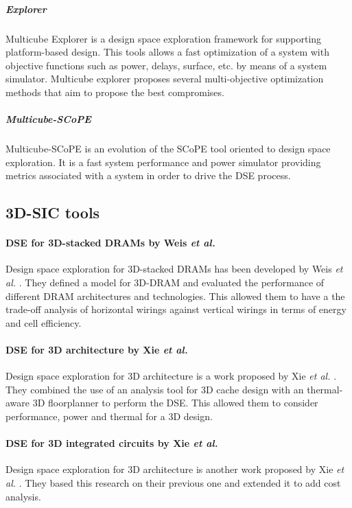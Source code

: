 \subparagraph{Explorer}

Multicube Explorer \cite{m3explorer09} is a design space exploration framework for supporting platform-based design. This tools allows a fast optimization of a system with objective functions such as power, delays, surface, etc. by means of a system simulator. Multicube explorer proposes several multi-objective optimization methods that aim to propose the best compromises.

\subparagraph{Multicube-SCoPE}

Multicube-SCoPE \cite{m3scope09} is an evolution of the SCoPE tool \cite{scope04} oriented to design space exploration. It is a fast system performance and power simulator providing metrics associated with a system in order to drive the DSE process.

\subsection{3D-SIC tools}

\paragraph{DSE for 3D-stacked DRAMs by Weis \textit{et al.}}
Design space exploration for 3D-stacked DRAMs has been developed by Weis \textit{et al.} \cite{5763068}. They defined a model for 3D-DRAM and evaluated the performance of different DRAM architectures and technologies. This allowed them to have a the trade-off analysis of horizontal wirings against vertical wirings in terms of energy and cell efficiency.

\paragraph{DSE for 3D architecture by Xie \textit{et al.}}
Design space exploration for 3D architecture is a work proposed by Xie \textit{et al.} \cite{Xie:2006:DSE:1148015.1148016}. They combined the use of an analysis tool for 3D cache design with an thermal-aware 3D floorplanner to perform the DSE. This allowed them to consider performance, power and thermal for a 3D design. 

\paragraph{DSE for 3D integrated circuits by Xie \textit{et al.}}
Design space exploration for 3D architecture is another work proposed by Xie \textit{et al.} \cite{4735042}. They based this research on their previous one and extended it to add cost analysis.

